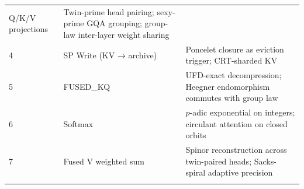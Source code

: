 \documentclass[
  11pt,
]{article}
\begin{document}
\begin{longtable}[]{@{}lll@{}}
\begin{minipage}[t]{0.17\columnwidth}
Q/K/V projections\strut
\end{minipage} & \begin{minipage}[t]{0.66\columnwidth}\raggedright
Twin-prime head pairing; sexy-prime GQA grouping; group-law inter-layer
weight sharing\strut
\end{minipage}\tabularnewline
\begin{minipage}[t]{0.08\columnwidth}\raggedright
4\strut
\end{minipage} & \begin{minipage}[t]{0.17\columnwidth}\raggedright
SP Write (KV → archive)\strut
\end{minipage} & \begin{minipage}[t]{0.66\columnwidth}\raggedright
Poncelet closure as eviction trigger; CRT-sharded KV\strut
\end{minipage}\tabularnewline
\begin{minipage}[t]{0.08\columnwidth}\raggedright
5\strut
\end{minipage} & \begin{minipage}[t]{0.17\columnwidth}\raggedright
FUSED\_KQ\strut
\end{minipage} & \begin{minipage}[t]{0.66\columnwidth}\raggedright
UFD-exact decompression; Heegner endomorphism commutes with group
law\strut
\end{minipage}\tabularnewline
\begin{minipage}[t]{0.08\columnwidth}\raggedright
6\strut
\end{minipage} & \begin{minipage}[t]{0.17\columnwidth}\raggedright
Softmax\strut
\end{minipage} & \begin{minipage}[t]{0.66\columnwidth}\raggedright
\(p\)-adic exponential on integers; circulant attention on closed
orbits\strut
\end{minipage}\tabularnewline
\begin{minipage}[t]{0.08\columnwidth}\raggedright
7\strut
\end{minipage} & \begin{minipage}[t]{0.17\columnwidth}\raggedright
Fused V weighted sum\strut
\end{minipage} & \begin{minipage}[t]{0.66\columnwidth}\raggedright
Spinor reconstruction across twin-paired heads; Sacks-spiral adaptive
precision\strut
\end{minipage}\tabularnewline
\begin{minipage}[t]{0.08\columnwidth}\raggedright

\end{minipage}
\end{longtable}
\end{document}
